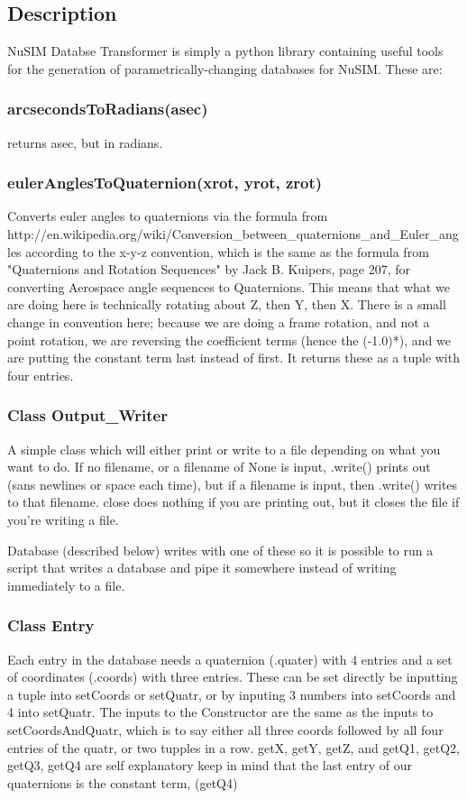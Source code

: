 \subsection{Description}
	NuSIM Databse Transformer is simply a python library containing 
useful tools for the generation of parametrically-changing databases for 
NuSIM. These are:

\subsubsection{arcsecondsToRadians(asec)}
returns asec, but in radians.

\subsubsection{eulerAnglesToQuaternion(xrot, yrot, zrot)}
	Converts euler angles to quaternions via the formula from \newline
http://en.wikipedia.org/wiki/Conversion\_between\_quaternions\_and\_Euler\_angles 
according to the x-y-z convention, which is the same as the formula from 
"Quaternions and Rotation Sequences" by Jack B. Kuipers, page 207, for 
converting Aerospace angle sequences to Quaternions. This means that  what 
we are doing here is technically rotating about Z, then Y, then X. There is 
a small change in convention here; because we are doing a  frame rotation, 
and not a point rotation, we are reversing the coefficient terms (hence the 
(-1.0)*), and we are putting the constant term last instead of first. It 
returns these as a tuple with four entries. 

\subsubsection{Class Output\_Writer}
	A simple class which will either print or write to a file depending 
on what you want to do.  If no filename, or a filename of None is 
input, .write() prints out (sans newlines or space each time), but if a 
filename is input, then .write() writes to that filename. close does 
nothing if you are printing out, but it closes the file if you're writing a 
file.

	Database (described below) writes with one of these so it is 
possible to run a script that writes a database and pipe it somewhere 
instead of writing immediately to a file.

\subsubsection{Class Entry}
	Each entry in the database needs a quaternion (.quater) with 4 
entries and a set of coordinates (.coords) with three entries. These can be 
set directly be inputting a tuple into setCoords or  setQuatr, or by 
inputing 3 numbers into setCoords and 4 into setQuatr. The inputs to the 
Constructor are the same as the inputs to setCoordsAndQuatr, which is to 
say either all three coords followed  by all four entries of the quatr, or 
two tupples in a row.  getX, getY, getZ, and getQ1, getQ2, getQ3, getQ4 are 
self explanatory keep in mind that the last entry of our quaternions is the 
constant term, (getQ4)


